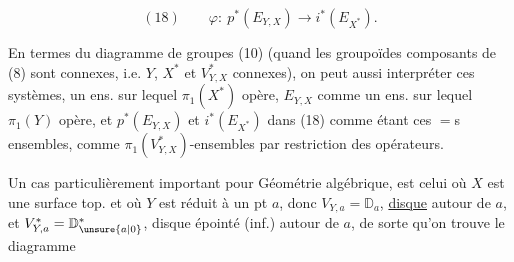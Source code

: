 \[
(18)\qquad \varphi:\ p^*(E_{Y,X})\longrightarrow i^*(E_{X^*}).
\]

En termes du diagramme de groupes
(10) (quand les  groupoïdes composants de
(8) sont connexes, i.e. $Y$, $X^*$ et $V^*_{Y,X}$
connexes), on peut aussi interpréter
ces systèmes, 
un ens. sur lequel $\pi_1(X^*)$ opère, $E_{Y,X}$
comme un ens. sur lequel $\pi_1(Y)$ opère,
et $p^*(E_{Y,X})$ et $i^*(E_{X^*})$ dans (18) comme
étant ces $=$s ensembles,  comme
$\pi_1(V^*_{Y,X})$-ensembles  par restriction
des opérateurs.


Un cas  particulièrement important
pour  Géométrie algébrique,
est celui où $X$ est une surface
top. et où $Y$ est réduit à un pt $a$,
donc $V_{Y,a}=\mathbb D_a$, \uline{disque}  autour de $a$,
et $V^*_{Y,a}=\mathbb D^*_{\unsure{a|0}}$, disque épointé (inf.) autour
de $a$, de sorte qu'on trouve le diagramme
